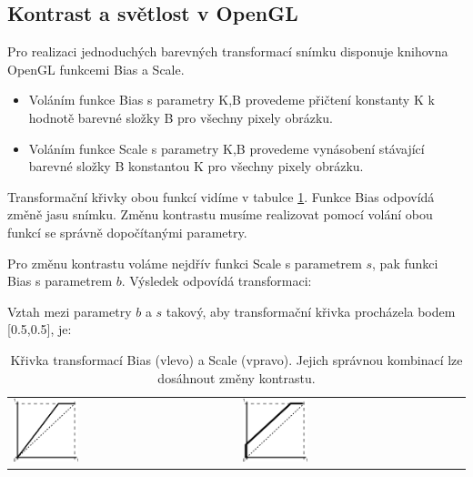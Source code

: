 \newpage
\subsection{Kontrast a světlost v OpenGL}
Pro realizaci jednoduchých barevných transformací snímku disponuje knihovna OpenGL funkcemi Bias a Scale.

\begin{itemize}
\item Voláním funkce Bias s parametry K,B provedeme přičtení konstanty K k hodnotě barevné složky B pro všechny pixely obrázku.
\item Voláním funkce Scale s parametry K,B provedeme vynásobení stávající barevné složky B konstantou K pro všechny pixely obrázku.
\end{itemize}

Transformační křivky obou funkcí vidíme v tabulce \ref{biasscale}. Funkce Bias odpovídá změně jasu snímku. Změnu kontrastu musíme realizovat pomocí volání obou funkcí se správně dopočítanými parametry.

Pro změnu kontrastu voláme nejdřív funkci Scale s parametrem $s$, pak funkci Bias s parametrem $b$. Výsledek odpovídá transformaci:
 

Vztah mezi parametry $b$ a $s$ takový, aby transformační křivka procházela bodem [0.5,0.5], je:


\noindent
\begin{table}[ht]
	\label{biasscale}
	\centering
		\begin{tabular}{p{}p{}}
			\includegraphics[width=0.3\textwidth]{Text/IMG/Bias.png}
		&
			\includegraphics[width=0.3\textwidth]{Text/IMG/Scale.png}
		\end{tabular}
	\caption{Křivka transformací Bias (vlevo) a Scale (vpravo). Jejich správnou kombinací lze dosáhnout změny kontrastu.}
\end{table}

